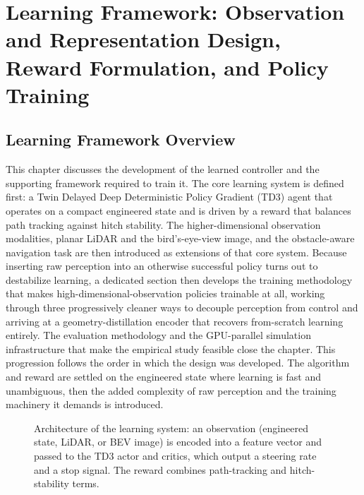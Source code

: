 \chapter{Learning Framework: Observation and Representation Design, Reward Formulation, and Policy Training}
\label{ch:learning_framework}

\section{Learning Framework Overview}

This chapter discusses the development of the learned controller and the supporting framework required to train it. The core learning system is defined first: a Twin Delayed Deep Deterministic Policy Gradient (TD3) agent that operates on a compact engineered state and is driven by a reward that balances path tracking against hitch stability. The higher-dimensional observation modalities, planar LiDAR and the bird's-eye-view image, and the obstacle-aware navigation task are then introduced as extensions of that core system. Because inserting raw perception into an otherwise successful policy turns out to destabilize learning, a dedicated section then develops the training methodology that makes high-dimensional-observation policies trainable at all, working through three progressively cleaner ways to decouple perception from control and arriving at a geometry-distillation encoder that recovers from-scratch learning entirely. The evaluation methodology and the GPU-parallel simulation infrastructure that make the empirical study feasible close the chapter. This progression follows the order in which the design was developed. The algorithm and reward are settled on the engineered state where learning is fast and unambiguous, then the added complexity of raw perception and the training machinery it demands is introduced.

\begin{figure}[H]
    \centering
    \resizebox{\textwidth}{!}{}
    \caption{Architecture of the learning system: an observation (engineered state, LiDAR, or BEV image) is encoded into a feature vector and passed to the TD3 actor and critics, which output a steering rate and a stop signal. The reward combines path-tracking and hitch-stability terms.}
    \label{fig:learning_framework}
\end{figure}

